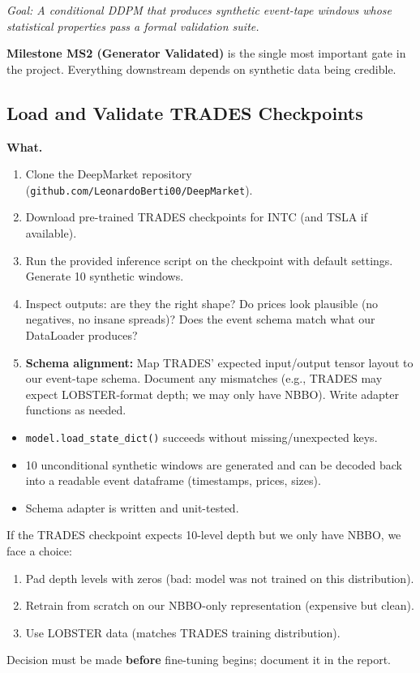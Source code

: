 \documentclass[11pt,a4paper]{article}
\begin{document}
\textit{Goal: A conditional DDPM that produces synthetic event-tape windows whose statistical properties pass a formal validation suite.}

\textbf{Milestone MS2 (Generator Validated)} is the single most important gate in the project.  Everything downstream depends on synthetic data being credible.

\subsection{Load and Validate TRADES Checkpoints}

\textbf{What.}
\begin{enumerate}[nosep]
  \item Clone the DeepMarket repository (\texttt{github.com/LeonardoBerti00/DeepMarket}).
  \item Download pre-trained TRADES checkpoints for INTC (and TSLA if available).
  \item Run the provided inference script on the checkpoint with default settings.  Generate 10 synthetic windows.
  \item Inspect outputs: are they the right shape?  Do prices look plausible (no negatives, no insane spreads)?  Does the event schema match what our DataLoader produces?
  \item \textbf{Schema alignment:}  Map TRADES' expected input/output tensor layout to our event-tape schema.  Document any mismatches (e.g., TRADES may expect LOBSTER-format depth; we may only have NBBO).  Write adapter functions as needed.
\end{enumerate}

\begin{successbox}
  \begin{itemize}[nosep]
    \item \texttt{model.load\_state\_dict()} succeeds without missing/unexpected keys.
    \item 10 unconditional synthetic windows are generated and can be decoded back into a readable event dataframe (timestamps, prices, sizes).
    \item Schema adapter is written and unit-tested.
  \end{itemize}
\end{successbox}

\begin{warnbox}
  If the TRADES checkpoint expects 10-level depth but we only have NBBO, we face a choice:
  \begin{enumerate}[nosep]
    \item Pad depth levels with zeros (bad: model was not trained on this distribution).
    \item Retrain from scratch on our NBBO-only representation (expensive but clean).
    \item Use LOBSTER data (matches TRADES training distribution).
  \end{enumerate}
  Decision must be made \textbf{before} fine-tuning begins; document it in the report.
\end{warnbox}
\end{document}
